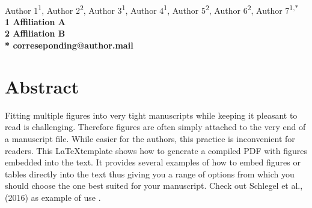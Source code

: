 \documentclass[10pt,letterpaper]{article}
\begin{document}
\vspace*{0.35in}

\begin{flushleft}
{\Large
\textbf{}
}
\newline
\\
Author 1\textsuperscript{1},
Author 2\textsuperscript{2},
Author 3\textsuperscript{1},
Author 4\textsuperscript{1},
Author 5\textsuperscript{2},
Author 6\textsuperscript{2},
Author 7\textsuperscript{1,*}
\\
\bigskip
\bf{1} Affiliation A
\\
\bf{2} Affiliation B
\\
\bigskip
* correseponding@author.mail

\end{flushleft}

\section*{Abstract}
Fitting multiple figures into very tight manuscripts while keeping it pleasant to read is challenging. Therefore figures are often simply attached to the very end of a manuscript file. While easier for the authors, this practice is inconvenient for readers. This \LaTeX template shows how to generate a compiled PDF with figures embedded into the text. It provides several examples of how to embed figures or tables directly into the text thus giving you a range of options from which you should choose the one best suited for your manuscript. Check out Schlegel et al., (2016) as example of use \cite{Schlegel2016}.

\linenumbers

\end{document}
